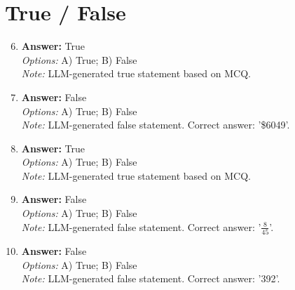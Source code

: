 \documentclass[12pt]{article}
\begin{document}
\section*{True / False}
\begin{enumerate}[label=\arabic*.]
\setcounter{enumi}{5}
\item \textbf{Answer:} True
\\ \textit{Options:} A) True; B) False
\\ \textit{Note:} LLM-generated true statement based on MCQ.
\item \textbf{Answer:} False
\\ \textit{Options:} A) True; B) False
\\ \textit{Note:} LLM-generated false statement. Correct answer: '\$6049'.
\item \textbf{Answer:} True
\\ \textit{Options:} A) True; B) False
\\ \textit{Note:} LLM-generated true statement based on MCQ.
\item \textbf{Answer:} False
\\ \textit{Options:} A) True; B) False
\\ \textit{Note:} LLM-generated false statement. Correct answer: '\ensuremath{\frac{8}{45}}'.
\item \textbf{Answer:} False
\\ \textit{Options:} A) True; B) False
\\ \textit{Note:} LLM-generated false statement. Correct answer: '392'.
\end{enumerate}
\end{document}
